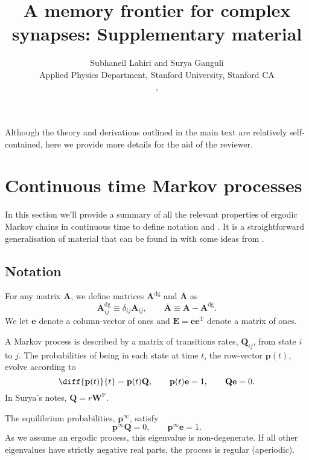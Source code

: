 \documentclass{article} %
\title{A memory frontier for complex synapses: Supplementary material}
\author{Subhaneil Lahiri and Surya Ganguli\\
Applied Physics Department, Stanford University, Stanford CA\\
\emaillink{sulahiri@stanford.edu}, \emaillink{sulahiri@stanford.edu}
%
}
\newcommand{\dg}{^\mathrm{dg}}
\newcommand{\trans}{^\mathrm{T}}
\newcommand{\onev}{\mathbf{e}}
\newcommand{\onem}{\mathbf{E}}
\newcommand{\MM}{\mathbf{Q}}
\newcommand{\pr}{\mathbf{p}}
\newcommand{\eq}{\pr^\infty}
\newcommand{\W}{\mathbf{W}}
\newcommand{\frg}{\W^{\mathrm{F}}}
\begin{document}
\maketitle



Although the theory and derivations outlined in the main text are relatively self-contained, here we provide more details for the aid of the reviewer.

\section{Continuous time Markov processes}\label{sec:ContMarkov}

In this section we'll provide a summary of all the relevant properties of ergodic Markov chains in continuous time to define notation and .
It is a straightforward generalisation of material that can be found in \cite{kemeny1960finite} with some ideas from \cite{hunter2000survey}.


\subsection{Notation}\label{sec:not}

For any matrix $\mathbf{A}$, we define matrices $\mathbf{A}\dg$ and $\overline{\mathbf{A}}$ as
%
\begin{equation}\label{eq:dgdef}
  \mathbf{A}\dg_{ij} \equiv \delta_{ij}\mathbf{A}_{ij},
  \qquad
  \overline{\mathbf{A}} \equiv \mathbf{A}-\mathbf{A}\dg.
\end{equation}
%
We let $\onev$ denote a column-vector of ones and $\onem=\onev\onev\trans$ denote a matrix of ones.


A Markov process is described by a matrix of transitions rates, $\MM_{ij}$, from state $i$ to $j$.
The probabilities of being in each state at time $t$, the row-vector $\mathbf{p}(t)$, evolve according to
%
\begin{equation}\label{eq:rowsum}
  \diff{\mathbf{p}(t)}{t} = \mathbf{p}(t) \MM,
  \qquad
  \mathbf{p}(t)\onev=1,
  \qquad
  \MM\onev=0.
\end{equation}
%
In Surya's notes, $\MM=r\frg$.

The equilibrium probabilities, $\eq$, satisfy
%
\begin{equation}\label{eq:equilibrium}
  \eq\MM=0,
  \qquad
  \eq\onev=1.
\end{equation}
%
As we assume an ergodic process, this eigenvalue is non-degenerate.
If all other eigenvalues have strictly negative real parts, the process is regular (aperiodic).
\end{document}

